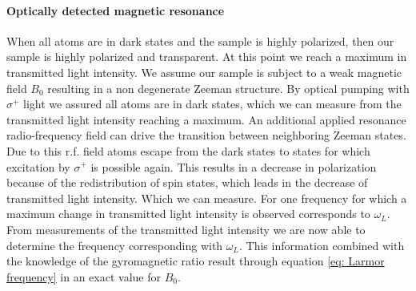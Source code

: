 \documentclass[a4paper,kul]{kulakarticle} %
\begin{document}
\paragraph{Optically detected magnetic resonance}	
When all atoms are in dark states and the sample is highly polarized, then our sample is highly polarized and transparent. At this point we reach a maximum in transmitted light intensity. We assume our sample is subject to a weak magnetic field $B_{0}$ resulting in a non degenerate Zeeman structure. By optical pumping with $\sigma^{+}$ light we assured all atoms are in dark states, which we can measure from the transmitted light intensity reaching a maximum. An additional applied resonance radio-frequency field can drive the transition between neighboring Zeeman states. Due to this r.f. field atoms escape from the dark states to states for which excitation by $\sigma^{+}$ is possible again. This results in a decrease in polarization because of the redistribution of spin states, which leads in the decrease of transmitted light intensity. Which we can measure. For one frequency for which a maximum change in transmitted light intensity is observed corresponds to $\omega_{L}$.\\

From measurements of the transmitted light intensity we are now able to determine the frequency corresponding with $\omega_{L}$. This information combined with the knowledge of the gyromagnetic ratio result through equation \ref{eq: Larmor frequency} in an exact value for $B_{0}$.  
\end{document}
